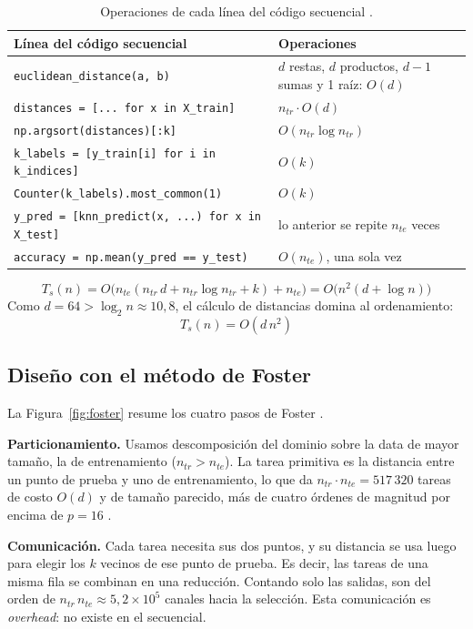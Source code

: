 \documentclass[11pt,a4paper]{article}
\newcommand{\ntr}{n_{tr}}
\newcommand{\nte}{n_{te}}
\begin{document}
\begin{table}[ht]
\centering\footnotesize
\begin{tabular}{ll}
  \toprule
  \textbf{Línea del código secuencial} & \textbf{Operaciones} \\
  \midrule
  \texttt{euclidean\_distance(a, b)} & $d$ restas, $d$ productos, $d-1$ sumas y 1 raíz: $O(d)$ \\
  \texttt{distances = [... for x in X\_train]} & $\ntr\cdot O(d)$ \\
  \texttt{np.argsort(distances)[:k]} & $O(\ntr\log\ntr)$ \\
  \texttt{k\_labels = [y\_train[i] for i in k\_indices]} & $O(k)$ \\
  \texttt{Counter(k\_labels).most\_common(1)} & $O(k)$ \\
  \texttt{y\_pred = [knn\_predict(x, ...) for x in X\_test]} & lo anterior se repite $\nte$ veces \\
  \texttt{accuracy = np.mean(y\_pred == y\_test)} & $O(\nte)$, una sola vez \\
  \bottomrule
\end{tabular}
\caption{Operaciones de cada línea del código secuencial \cite{base}.}
\label{tab:secuencial}
\end{table}

\[
T_s(n)=O\big(\nte(\ntr\, d+\ntr\log\ntr+k)+\nte\big)=O\big(n^2(d+\log n)\big)
\]
Como $d=64>\log_2 n\approx 10{,}8$, el cálculo de distancias domina al ordenamiento:
\[
T_s(n)=O(d\,n^2)
\]

\subsection{Diseño con el método de Foster}
\label{sec:foster}

La Figura~\ref{fig:foster} resume los cuatro pasos de Foster \cite{slides}.

\textbf{Particionamiento.} Usamos descomposición del dominio sobre la data de mayor tamaño, la de entrenamiento ($\ntr>\nte$). La tarea primitiva es la distancia entre un punto de prueba y uno de entrenamiento, lo que da $\ntr\cdot\nte=517\,320$ tareas de costo $O(d)$ y de tamaño parecido, más de cuatro órdenes de magnitud por encima de $p=16$ \cite{slides}.

\textbf{Comunicación.} Cada tarea necesita sus dos puntos, y su distancia se usa luego para elegir los $k$ vecinos de ese punto de prueba. Es decir, las tareas de una misma fila se combinan en una reducción. Contando solo las salidas, son del orden de $\ntr\,\nte\approx 5{,}2\times 10^5$ canales hacia la selección. Esta comunicación es \textit{overhead}: no existe en el secuencial.
\end{document}
